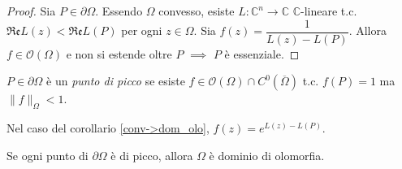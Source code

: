 \begin{proof}
  Sia $P \in \partial \Omega$. Essendo $\Omega$ convesso, esiste $L: \mathbb{C}^n \longrightarrow \mathbb{C}$ $\mathbb{C}$-lineare t.c. $\mathfrak{Re}L(z) < \mathfrak{Re}L(P)$ per ogni $z \in \Omega$. Sia $f(z)=\dfrac{1}{L(z)-L(P)}$. Allora $f \in \mathcal{O}(\Omega)$ e non si estende oltre $P$ $\implies$ $P$ è essenziale.
\end{proof}

\begin{defn}
  $P \in \partial\Omega$ è un \textit{punto di picco} se esiste $f \in \mathcal{O}(\Omega) \cap C^0(\overline{\Omega})$ t.c. $f(P)=1$ ma $\|f\|_\Omega<1$.
\end{defn}

\begin{ex}
  Nel caso del corollario \ref{conv->dom_olo}, $f(z)=e^{L(z)-L(P)}$.
\end{ex}

\begin{exc}
  Se ogni punto di $\partial\Omega$ è di picco, allora $\Omega$ è dominio di olomorfia.
\end{exc}
